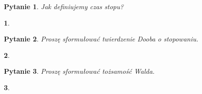\documentclass[10pt]{mwart}
\theoremstyle{plain}
\newtheorem{pytanie}{Pytanie}
\theoremstyle{break}
\newtheorem*{odpowiedź}{}
\begin{document}
\begin{pytanie}
Jak definiujemy czas stopu?
\end{pytanie}
\begin{odpowiedź}
\end{odpowiedź}


\begin{pytanie}
Proszę sformułować twierdzenie Dooba o stopowaniu.
\end{pytanie}
\begin{odpowiedź}
\end{odpowiedź}


\begin{pytanie}
Proszę sformułować tożsamość Walda.
\end{pytanie}
\begin{odpowiedź}
\end{odpowiedź}
\end{document}
